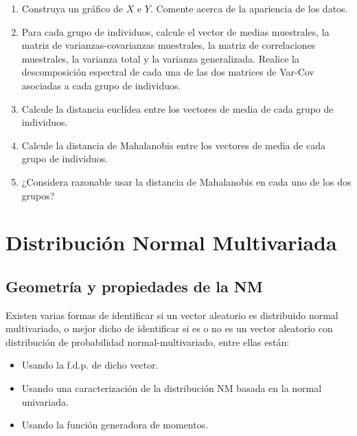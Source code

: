 \documentclass[
]{book}
\providecommand{\tightlist}{%
  \setlength{\itemsep}{0pt}\setlength{\parskip}{0pt}}
\theoremstyle{definition}
\theoremstyle{definition}
\theoremstyle{definition}
\theoremstyle{definition}
\theoremstyle{remark}
\begin{document}
\begin{enumerate}
\def\labelenumi{\arabic{enumi}.}
\item
  Construya un gráfico de \(X\) e \(Y\). Comente acerca de la apariencia de los datos.
\item
  Para cada grupo de individuos, calcule el vector de medias muestrales, la matriz de varianzas-covarianzas muestrales, la matriz de correlaciones muestrales, la varianza total y la varianza generalizada. Realice la descomposición espectral de cada una de las dos matrices de Var-Cov asociadas a cada grupo de individuos.
\item
  Calcule la distancia euclídea entre los vectores de media de cada grupo de individuos.
\item
  Calcule la distancia de Mahalanobis entre los vectores de media de cada grupo de individuos.
\item
  ¿Considera razonable usar la distancia de Mahalanobis en cada uno de los dos grupos?
\end{enumerate}

\newcommand{\va}{\underline{X}}

\newcommand{\xnp}{\underline{X} \sim N_p(\underline{\mu},\Sigma)}

\hypertarget{Normal-Multiv}{%
\chapter{Distribución Normal Multivariada}\label{Normal-Multiv}}

\hypertarget{geometria-NM}{%
\section{Geometría y propiedades de la NM}\label{geometria-NM}}

Existen varias formas de identificar si un vector aleatorio es distribuido normal multivariado, o mejor dicho de identificar si es o no es un vector aleatorio con distribución de probabilidad normal-multivariado, entre ellas están:

\begin{itemize}
\tightlist
\item
  Usando la f.d.p. de dicho vector.
\item
  Usando una caracterización de la distribución NM basada en la normal univariada.
\item
  Usando la función generadora de momentos.
\end{itemize}
\end{document}
